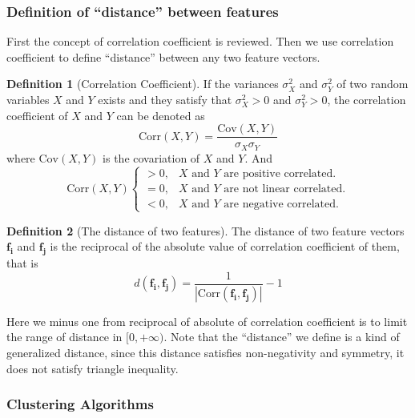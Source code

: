 \documentclass{ieeeaccess}
\theoremstyle{definition}
\newtheorem{defn}{Definition}
\begin{document}
\subsubsection{Definition of ``distance'' between features}

First the concept of correlation coefficient is reviewed. Then we use correlation coefficient to define ``distance'' between any two feature vectors. 

\begin{defn}[Correlation Coefficient]
    If the variances $\sigma^2_X$ and $\sigma_Y^2$ of two random variables $X$ and $Y$ exists and they satisfy that $\sigma^2_X > 0$ and $\sigma^2_Y > 0$, the correlation coefficient of $X$ and $Y$ can be denoted as
    \begin{equation}
        \text{Corr}(X, Y) = \frac{\text{Cov}(X, Y)}{\sigma_X \sigma_Y}
    \end{equation}
    where $\text{Cov}(X, Y)$ is the covariation of $X$ and $Y$. And
    $$\text{Corr}(X, Y) 
    \begin{cases}
    > 0, & X \text{ and } Y \text{ are positive correlated.}\\
    = 0, & X \text{ and } Y \text{ are not linear correlated.} \\
    < 0, & X \text{ and } Y \text{ are negative correlated.}
    \end{cases}$$
\end{defn}

\begin{defn}[The distance of two features]
    \label{def:distance}
    The distance of two feature vectors $\bm{f_i}$ and $\bm{f_j}$ is the reciprocal of the absolute value of correlation coefficient of them, that is
    \begin{equation}
        \label{eq:distance}
        d(\bm{f_i}, \bm{f_j}) = \frac{1}{|\text{Corr}(\bm{f_i}, \bm{f_j})|}-1
    \end{equation}
    \end{defn}

Here we minus one from reciprocal of absolute of correlation coefficient is to limit the range of distance in $[0, +\infty)$. Note that the ``distance'' we define is a kind of generalized distance, since this distance satisfies non-negativity and symmetry, it does not satisfy triangle inequality. 

\subsubsection{Clustering Algorithms}
\end{document}
